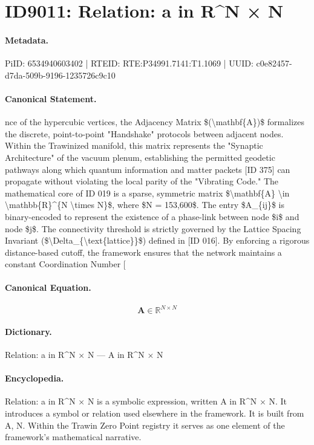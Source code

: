 \section*{ID9011: Relation: a in R\textasciicircum{}N × N}
\paragraph{Metadata.}
PiID: 6534940603402 | RTEID: RTE:P34991.7141:T1.1069 | UUID: c0e82457-d7da-509b-9196-1235726c9c10

\paragraph{Canonical Statement.}
nce of the hypercubic vertices, the Adjacency Matrix \$(\textbackslash{}mathbf\{A\})\$ formalizes the discrete, point-to-point "Handshake" protocols between adjacent nodes. Within the Trawinized manifold, this matrix represents the "Synaptic Architecture" of the vacuum plenum, establishing the permitted geodetic pathways along which quantum information and matter packets [ID 375] can propagate without violating the local parity of the "Vibrating Code." The mathematical core of ID 019 is a sparse, symmetric matrix \$\textbackslash{}mathbf\{A\} \textbackslash{}in \textbackslash{}mathbb\{R\}\textasciicircum{}\{N \textbackslash{}times N\}\$, where \$N = 153,600\$. The entry \$A\_\{ij\}\$ is binary-encoded to represent the existence of a phase-link between node \$i\$ and node \$j\$. The connectivity threshold is strictly governed by the Lattice Spacing Invariant (\$\textbackslash{}Delta\_\{\textbackslash{}text\{lattice\}\}\$) defined in [ID 016]. By enforcing a rigorous distance-based cutoff, the framework ensures that the network maintains a constant Coordination Number [

\paragraph{Canonical Equation.}
\[
\mathbf{A} \in \mathbb{R}^{N \times N}
\]

\paragraph{Dictionary.}
Relation: a in R\textasciicircum{}N × N — A in R\textasciicircum{}N × N

\paragraph{Encyclopedia.}
Relation: a in R\textasciicircum{}N × N is a symbolic expression, written A in R\textasciicircum{}N × N. It introduces a symbol or relation used elsewhere in the framework. It is built from A, N. Within the Trawin Zero Point registry it serves as one element of the framework's mathematical narrative.
